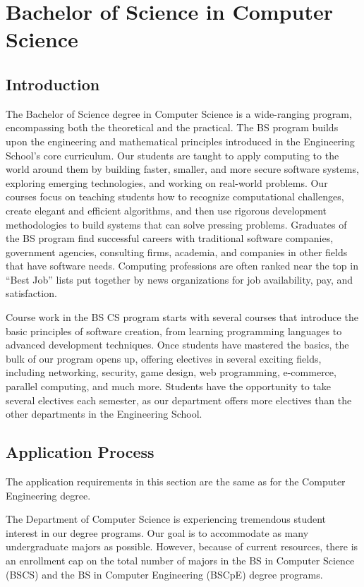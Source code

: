 \documentclass[10pt,letter]{book}
\newcommand{\mychapter}[2]{\chapter{#1}\renewcommand{\leftmark}{\textsc{#2}}}
\newcommand{\mysection}[1]{\section{#1}\renewcommand{\rightmark}{#1}}
\begin{document}
\clearpage
\mychapter{Bachelor of Science in Computer Science}{BS CS Degree}


\mysection{Introduction}


The Bachelor of Science degree in Computer Science is a wide-ranging
program, encompassing both the theoretical and the practical.  The BS
program builds upon the engineering and mathematical principles
introduced in the Engineering School's core curriculum.  Our students
are taught to apply computing to the world around them by building
faster, smaller, and more secure software systems, exploring emerging
technologies, and working on real-world problems.  Our courses focus
on teaching students how to recognize computational challenges, create
elegant and efficient algorithms, and then use rigorous development
methodologies to build systems that can solve pressing
problems. Graduates of the BS program find successful careers with
traditional software companies, government agencies, consulting firms,
academia, and companies in other fields that have software needs.
Computing professions are often ranked near the top in ``Best Job''
lists put together by news organizations for job availability, pay,
and satisfaction.

Course work in the BS CS program starts with several courses that
introduce the basic principles of software creation, from learning
programming languages to advanced development techniques.  Once
students have mastered the basics, the bulk of our program opens up,
offering electives in several exciting fields, including networking,
security, game design, web programming, e-commerce, parallel
computing, and much more.  Students have the opportunity to take
several electives each semester, as our department offers more
electives than the other departments in the Engineering School. 

\mysection{Application Process}
\label{bscsapplicationprocess}

The application requirements in this section are the same as for the
Computer Engineering degree.

The Department of Computer Science is experiencing tremendous student
interest in our degree programs. Our goal is to accommodate as many
undergraduate majors as possible. However, because of current
resources, there is an enrollment cap on the total number of
majors in the BS in Computer Science (BSCS) and the BS in Computer
Engineering (BSCpE) degree programs.
\end{document}
